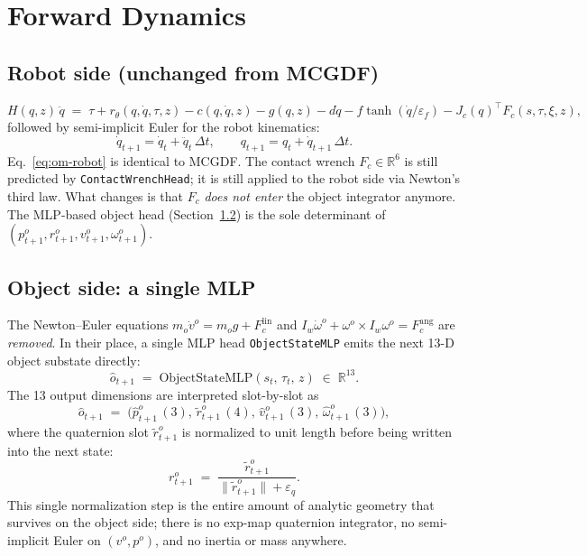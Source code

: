 \documentclass[11pt]{article}
\begin{document}
\section{Forward Dynamics}

\subsection{Robot side (unchanged from MCGDF)}

\begin{equation}
  H(q,z)\,\ddot q
  \;=\;
  \tau + r_\theta(q,\dot q,\tau,z)
  - c(q,\dot q,z) - g(q,z)
  - d\dot q - f\tanh(\dot q/\varepsilon_f)
  - J_c(q)^\top F_c(s,\tau,\xi,z),
  \label{eq:om-robot}
\end{equation}
followed by semi-implicit Euler for the robot kinematics:
\begin{equation}
  \dot q_{t+1} = \dot q_t + \ddot q_t\,\Delta t,
  \qquad
  q_{t+1} = q_t + \dot q_{t+1}\,\Delta t.
\end{equation}
Eq.~\eqref{eq:om-robot} is identical to MCGDF.  The contact wrench
$F_c \in \mathbb{R}^6$ is still predicted by
\texttt{ContactWrenchHead}; it is still applied to the robot side via
Newton's third law.  What changes is that $F_c$ \emph{does not enter}
the object integrator anymore.  The MLP-based object head
(Section~\ref{sec:om-object}) is the sole determinant of
$(p^o_{t+1}, r^o_{t+1}, v^o_{t+1}, \omega^o_{t+1})$.

\subsection{Object side: a single MLP}
\label{sec:om-object}

The Newton--Euler equations
$m_o \dot v^o = m_o g + F_c^{\mathrm{lin}}$ and
$I_w \dot \omega^o + \omega^o\!\times\!I_w\omega^o = F_c^{\mathrm{ang}}$
are \emph{removed}.  In their place, a single MLP head
\texttt{ObjectStateMLP} emits the next 13-D object substate
directly:
\begin{equation}
  \hat o_{t+1}
  \;=\;
  \mathrm{ObjectStateMLP}(s_t,\,\tau_t,\,z)
  \;\in\; \mathbb{R}^{13}.
  \label{eq:om-objmlp}
\end{equation}
The 13 output dimensions are interpreted slot-by-slot as
\begin{equation}
  \hat o_{t+1}
  \;=\;
  \bigl(
    \hat p^o_{t+1}\,(3),\,
    \tilde r^o_{t+1}\,(4),\,
    \hat v^o_{t+1}\,(3),\,
    \hat \omega^o_{t+1}\,(3)
  \bigr),
\end{equation}
where the quaternion slot $\tilde r^o_{t+1}$ is normalized to unit
length before being written into the next state:
\begin{equation}
  r^o_{t+1} \;=\; \frac{\tilde r^o_{t+1}}{\|\tilde r^o_{t+1}\| + \varepsilon_q}.
\end{equation}
This single normalization step is the entire amount of analytic
geometry that survives on the object side; there is no
exp-map quaternion integrator, no semi-implicit Euler on
$(v^o, p^o)$, and no inertia or mass anywhere.
\end{document}
